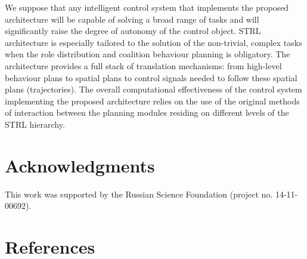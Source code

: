 \documentclass[review]{elsarticle}
\begin{document}
We suppose that any intelligent control system that implements the proposed architecture will be capable of solving a broad range of tasks and will significantly raise the degree of autonomy of the control object. STRL architecture is especially tailored to the solution of the non-trivial, complex tasks when the role distribution and coalition behaviour planning is obligatory. The architecture provides a full stack of translation mechanisms: from high-level behaviour plans to spatial plans to control signals needed to follow these spatial plans (trajectories). The overall computational effectiveness of the control system implementing the proposed architecture relies on the use of the original methods of interaction between the planning modules residing on different levels of the STRL hierarchy.

\section{Acknowledgments}
This work was supported by the Russian Science Foundation (project no. 14-11-00692).

\section*{References}
\end{document}
